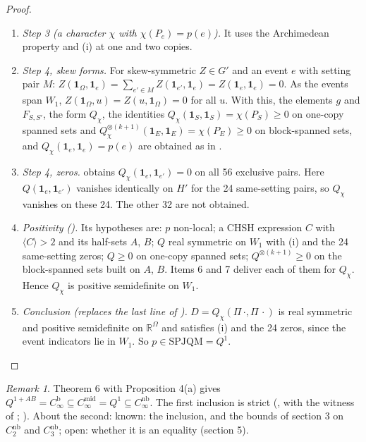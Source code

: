 \documentclass[11pt,a4paper]{article}
\theoremstyle{definition}
\theoremstyle{remark}
\newtheorem{remark}[theorem]{Remark}
\newcommand{\ind}[1]{\mathbf{1}_{#1}}
\newcommand{\SPJQM}{\mathrm{SPJQM}}
\newcommand{\nb}{\mathrm{nb}}
\newcommand{\md}{\mathrm{mid}}
\newcommand{\br}{\mathrm{b}}
\begin{document}
\begin{proof}
\begin{enumerate}
  \item \emph{Step 3 (a character $\chi$ with $\chi(P_e) = p(e)$).} It uses the Archimedean property and (i) at one and two copies.
  \item \emph{Step 4, skew forms.} For skew-symmetric $Z \in G'$ and an event $e$ with setting pair $M$: $Z(\ind{\Omega}, \ind{e}) = \sum_{e' \in M} Z(\ind{e'}, \ind{e}) = Z(\ind{e}, \ind{e}) = 0$. As the events span $W_1$, $Z(\ind{\Omega}, u) = Z(u, \ind{\Omega}) = 0$ for all $u$. With this, the elements $g$ and $F_{S,S'}$, the form $Q_\chi$, the identities $Q_\chi(\ind{S}, \ind{S}) = \chi(P_S) \ge 0$ on one-copy spanned sets and $Q_\chi^{\otimes(k+1)}(\ind{E}, \ind{E}) = \chi(P_E) \ge 0$ on block-spanned sets, and $Q_\chi(\ind{e}, \ind{e}) = p(e)$ are obtained as in \cite{R7}.
  \item \emph{Step 4, zeros.} \cite{R7} obtains $Q_\chi(\ind{e}, \ind{e'}) = 0$ on all 56 exclusive pairs. Here $Q(\ind{e}, \ind{e'})$ vanishes identically on $H'$ for the 24 same-setting pairs, so $Q_\chi$ vanishes on these 24. The other 32 are not obtained.
  \item \emph{Positivity (\cite[Proposition 7]{R7}).} Its hypotheses are: $p$ non-local; a CHSH expression $C$ with $\langle C \rangle > 2$ and its half-sets $A$, $B$; $Q$ real symmetric on $W_1$ with (i) and the 24 same-setting zeros; $Q \ge 0$ on one-copy spanned sets; $Q^{\otimes(k+1)} \ge 0$ on the block-spanned sets built on $A$, $B$. Items 6 and 7 deliver each of them for $Q_\chi$. Hence $Q_\chi$ is positive semidefinite on $W_1$.
  \item \emph{Conclusion (replaces the last line of \cite{R7}).} $D = Q_\chi(\Pi\,\cdot, \Pi\,\cdot)$ is real symmetric and positive semidefinite on $\mathbb{R}^{\Omega}$ and satisfies (i) and the 24 zeros, since the event indicators lie in $W_1$. So $p \in \SPJQM = Q^1$. \qedhere
\end{enumerate}
\end{proof}

\begin{remark}\label{r:chain}
Theorem 6 with Proposition 4(a) gives $Q^{1+AB} = C_\infty^{\br} \subseteq C_\infty^{\md} = Q^1 \subseteq C_\infty^{\nb}$. The first inclusion is strict (\cite[Remark 15]{R7}, with the witness of \cite[Section 3]{R7}; \cite[Corollary 6.3]{SP}). About the second: known: the inclusion, and the bounds of section 3 on $C_2^{\nb}$ and $C_3^{\nb}$; open: whether it is an equality (section 5).
\end{remark}
\end{document}

